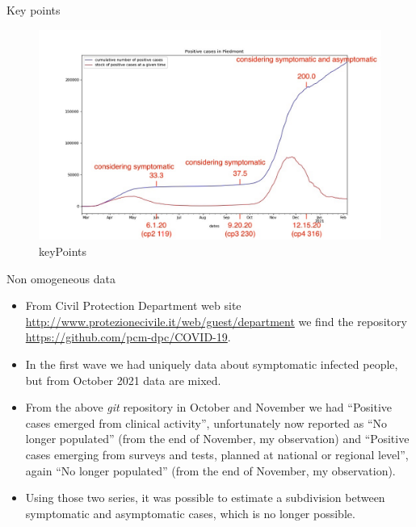 \documentclass[8pt]{beamer}
\begin{document}
\begin{frame}{Key points}

\begin{figure}[H]
\center
\includegraphics[scale=0.25]{andamento900annotato.jpg}
\caption{keyPoints} 
\label{Key points}
\end{figure}


\end{frame}

\begin{frame}{Non omogeneous data}

\begin{itemize}

\item From Civil Protection Department web site \url{http://www.protezionecivile.it/web/guest/department} we find the
 repository \url{https://github.com/pcm-dpc/COVID-19}.
 
 \item In the first wave we had uniquely data about symptomatic infected people, but from October 2021 data are mixed.
 
 \item From the above \emph{git}  repository in October and November we had ``Positive cases emerged from clinical activity'', unfortunately now reported as ``No longer populated'' (from the end of November, my observation) and ``Positive cases emerging from surveys and tests, planned at national or regional level'', again ``No longer populated'' (from the end of November, my observation).
 
 \item Using those two series, it was possible to estimate a subdivision between symptomatic and asymptomatic cases, which is no longer possible.
 
\end{itemize}

\end{frame}
\end{document}
